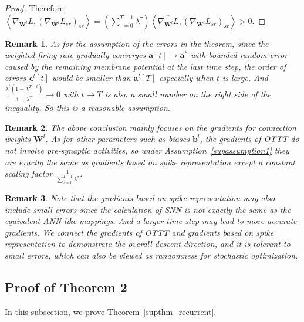 \documentclass{article}
\begin{document}
\begin{proof}
Therefore, $\left<\nabla_{\mathbf{W}^l}L, \left(\nabla_{\mathbf{W}^l}L_{sr}\right)_{sr}\right> = \left(\sum_{\tau=0}^{T-1}\lambda^\tau\right)\left<\widehat{\nabla_{\mathbf{W}^l}L}, \left(\nabla_{\mathbf{W}^l}L_{sr}\right)_{sr}\right> > 0$.

\end{proof}

\newtheorem{remark}{\bf Remark}
\begin{remark}
As for the assumption of the errors in the theorem, since the weighted firing rate gradually converges $\mathbf{a}[t]\rightarrow \mathbf{a}^*$ with bounded random error caused by the remaining membrane potential at the last time step, the order of errors $\bm{\epsilon}^l[t]$ would be smaller than $\mathbf{a}^l[T]$ especially when $t$ is large. And $\frac{\lambda^t(1-\lambda^{T-t})}{1-\lambda^T} \rightarrow 0$ with $t\rightarrow T$ is also a small number on the right side of the inequality. So this is a reasonable assumption.
\end{remark}

\begin{remark}
The above conclusion mainly focuses on the gradients for connection weights $\mathbf{W}^l$. As for other parameters such as biases $\mathbf{b}^l$, the gradients of OTTT do not involve pre-synaptic activities, so under Assumption~\ref{supassumption1} they are exactly the same as gradients based on spike representation except a constant scaling factor $\frac{1}{\sum_{\tau=0}^{T-1}\lambda^\tau}$.
\end{remark}

\begin{remark}
Note that the gradients based on spike representation may also include small errors since the calculation of SNN is not exactly the same as the equivalent ANN-like mappings. And a larger time step may lead to more accurate gradients. We connect the gradients of OTTT and gradients based on spike representation to demonstrate the overall descent direction, and it is tolerant to small errors, which can also be viewed as randomness for stochastic optimization.
\end{remark}

\subsection{Proof of Theorem 2}

In this subsection, we prove Theorem~\ref{supthm_recurrent}. 
\end{document}

